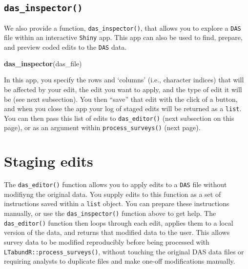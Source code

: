 \documentclass[
]{book}
\newenvironment{Shaded}{\begin{snugshade}}{\end{snugshade}}
\newcommand{\KeywordTok}[1]{\textcolor[rgb]{0.13,0.29,0.53}{\textbf{#1}}}
\newcommand{\NormalTok}[1]{#1}
\begin{document}
\hypertarget{das_inspector}{%
\subsection*{\texorpdfstring{\texttt{das\_inspector()}}{das\_inspector()}}\label{das_inspector}}

We also provide a function, \texttt{das\_inspector()}, that allows you to explore a \texttt{DAS} file within an interactive \texttt{Shiny} app. This app can also be used to find, prepare, and preview coded edits to the \texttt{DAS} data.

\begin{Shaded}
\begin{Highlighting}[]
\KeywordTok{das_inspector}\NormalTok{(das_file)}
\end{Highlighting}
\end{Shaded}

In this app, you specify the rows and `columns' (i.e., character indices) that will be affected by your edit, the edit you want to apply, and the type of edit it will be (see next subsection). You then ``save'' that edit with the click of a button, and when you close the app your log of staged edits will be returned as a \texttt{list}. You can then pass this list of edits to \texttt{das\_editor()} (next subsection on this page), or as an argument within \texttt{process\_surveys()} (next page).

\hypertarget{staging-edits}{%
\section*{Staging edits}\label{staging-edits}}

The \texttt{das\_editor()} function allows you to apply edits to a \texttt{DAS} file without modifiyng the original data. You supply edits to this function as a set of instructions saved within a \texttt{list} object. You can prepare these instructions manually, or use the \texttt{das\_inspector()} function above to get help. The \texttt{das\_editor()} function then loops through each edit, applies them to a local version of the data, and returns that modified data to the user. This allows survey data to be modified reproducibly before being processed with \texttt{LTabundR::process\_surveys()}, without touching the original DAS data files or requiring analysts to duplicate files and make one-off modifications manually.
\end{document}
